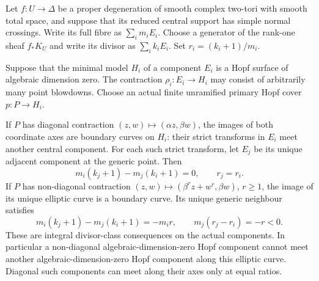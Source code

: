 
\begin{proposition}\label{cdp:st:C.2.UN.40}
Let $f:U\to\Delta$ be a proper degeneration of smooth complex
two-tori with smooth total space, and suppose that its reduced
central support has simple normal crossings. Write its full
fibre as $\sum_i m_iE_i$. Choose a generator of the rank-one
sheaf $f_*K_U$ and write its divisor as $\sum_i k_iE_i$.
Set $r_i=(k_i+1)/m_i$.

Suppose that the minimal model $H_i$ of a component $E_i$
is a Hopf surface of algebraic dimension zero. The contraction
$\rho_i:E_i\to H_i$ may consist of arbitrarily many point
blowdowns. Choose an actual finite unramified primary Hopf
cover $p:P\to H_i$.

If $P$ has diagonal contraction $(z,w)\mapsto(\alpha z,\beta w)$,
the images of both coordinate axes are boundary curves on
$H_i$: their strict transforms in $E_i$ meet another central
component. For each such strict transform, let $E_j$ be its
unique adjacent component at the generic point. Then
\[
                 m_i(k_j+1)-m_j(k_i+1)=0,
                 \qquad r_j=r_i.
\tag{C.HA.1}\label{cdp:eq:C.HA.1}
\]
If $P$ has non-diagonal contraction
$(z,w)\mapsto(\beta^r z+w^r,\beta w)$, $r\geq1$, the image
of its unique elliptic curve is a boundary curve. Its unique
generic neighbour satisfies
\[
       m_i(k_j+1)-m_j(k_i+1)=-m_i r,
       \qquad m_j(r_j-r_i)=-r<0.
\tag{C.HA.2}\label{cdp:eq:C.HA.2}
\]
These are integral divisor-class consequences on the actual
components. In particular a non-diagonal algebraic-dimension-zero
Hopf component cannot meet another algebraic-dimension-zero
Hopf component along this elliptic curve. Diagonal such
components can meet along their axes only at equal ratios.
\end{proposition}


